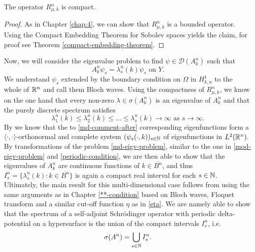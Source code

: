 \begin{theorem}
	The operator $R_{\mu, k}^{n}$ is compact.	

	\begin{proof}
		As in Chapter \ref{chap:4}, we can show that $R_{\mu, k}^{n}$ is a bounded operator. Using the Compact Embedding Theorem for Sobolev spaces yields the claim, for proof see Theorem \ref{compact-embedding-theorem}.
	\end{proof}
\end{theorem}

Now, we will consider the eigenvalue problem to find $\psi \in \mathcal{D}(A^{n}_{k})$ such that
	\begin{equation}
		A^{n}_{k} \psi_{s} = \lambda^{n}_{s}(k) \psi_{s} \text{ on } Y. \label{md-eigv-problem}
	\end{equation}
We understand $\psi_{s}$ extended by the boundary condition on $\Omega$ in $H^{1}_{k, n}$ to the whole of $\mathbb{R}^{n}$ and call them Bloch waves. Using the compactness of $R_{\mu, k}^{n}$, we know on the one hand that every non-zero $\lambda \in \sigma(A_{k}^{n})$ is an eigenvalue of $A_{k}^{n}$ and that the purely discrete spectrum satisfies
	\begin{equation}
		\lambda^{n}_{1}(k) \leq \lambda^{n}_{2}(k) \leq \dotsc \leq \lambda^{n}_{s}(k) \rightarrow \infty \text{ as } s \rightarrow \infty. \label{md-comment-after}
	\end{equation}
By \cite[page 643 - 645]{evans1998partial} we know that the to \eqref{md-comment-after} corresponding eigenfunctions form a $\langle \cdot , \cdot \rangle$-orthonormal and complete system $(\psi_{s}(\cdot, k))_{s \in \mathbb{N}}$ of eigenfunctions in $L^{2}(\mathbb{R}^{n})$. By transformations of the problem \eqref{md-eigv-problem}, similar to the one in \eqref{mod-eigv-problem} and \eqref{periodic-condition}, we are then able to show that the eigenvalues of $A^{n}_{k}$ are continuous functions of $k \in \overline{B^{n}}$, and thus $I^{n}_{s} = \{ \lambda^{n}_{s}(k) : k \in \overline{B^{n}} \}$ is again a compact real interval for each $s \in \mathbb{N}$.
~\\ 

Ultimately, the main result for this multi-dimensional case follows from using the same arguments as in Chapter \ref{**-condition} based on Bloch waves, Floquet transform and a similar cut-off function $\eta$ as in \eqref{eta}. We are namely able to show that the spectrum of a self-adjoint Schrödinger operator with periodic delta-potential on a hypersurface is the union of the compact intervals $I^{n}_{s}$, i.e.
	\[ \sigma(A^{n}) = \bigcup_{s \in \mathbb{N}} I^{n}_{s}. \]